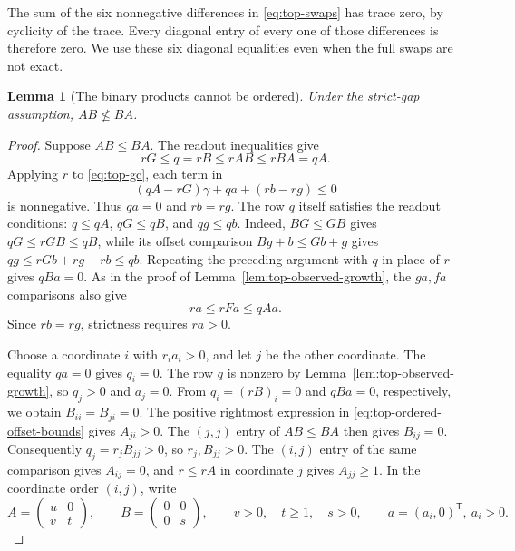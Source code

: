 \documentclass[11pt,a4paper]{article}
\newtheorem{lemma}[theorem]{Lemma}
\begin{document}
The sum of the six nonnegative differences in \eqref{eq:top-swaps}
has trace zero, by cyclicity of the trace. Every diagonal entry of
every one of those differences is therefore zero. We use these six
diagonal equalities even when the full swaps are not exact.

\begin{lemma}[The binary products cannot be ordered]\label{lem:top-ordered}
Under the strict-gap assumption, $AB\not\le BA$.
\end{lemma}
\begin{proof}
Suppose $AB\le BA$. The readout inequalities give
\[
rG\le q=rB\le rAB\le rBA=qA.
\]
Applying $r$ to \eqref{eq:top-gc}, each term in
\[
(qA-rG)\gamma+qa+(rb-rg)\le0
\]
is nonnegative. Thus $qa=0$ and $rb=rg$.
The row $q$ itself satisfies the readout conditions:
$q\le qA$, $qG\le qB$, and $qg\le qb$.
Indeed, $BG\le GB$ gives $qG\le rGB\le qB$, while its offset
comparison $Bg+b\le Gb+g$ gives
$qg\le rGb+rg-rb\le qb$.
Repeating the preceding argument with $q$ in place of $r$ gives
$qBa=0$. As in the proof of Lemma~\ref{lem:top-observed-growth},
the $ga,fa$ comparisons also give
\begin{equation}\label{eq:top-ordered-offset-bounds}
ra\le rFa\le qAa.
\end{equation}
Since $rb=rg$, strictness requires $ra>0$.

Choose a coordinate $i$ with $r_i a_i>0$, and let $j$ be the other
coordinate. The equality $qa=0$ gives $q_i=0$.
The row $q$ is nonzero by Lemma~\ref{lem:top-observed-growth},
so $q_j>0$ and $a_j=0$.
From $q_i=(rB)_i=0$ and $qBa=0$, respectively, we obtain
$B_{ii}=B_{ji}=0$. The positive rightmost expression in
\eqref{eq:top-ordered-offset-bounds} gives $A_{ji}>0$.
The $(j,j)$ entry of $AB\le BA$ then gives $B_{ij}=0$.
Consequently $q_j=r_jB_{jj}>0$, so $r_j,B_{jj}>0$.
The $(i,j)$ entry of the same comparison gives $A_{ij}=0$,
and $r\le rA$ in coordinate $j$ gives $A_{jj}\ge1$.
In the coordinate order $(i,j)$, write
\[
A=\begin{pmatrix}u&0\\v&t\end{pmatrix},\qquad
B=\begin{pmatrix}0&0\\0&s\end{pmatrix},
\qquad v>0,\quad t\ge1,\quad s>0,
\qquad a=(a_i,0)^{\mathsf T},\ a_i>0.
\]


\end{proof}
\end{document}
